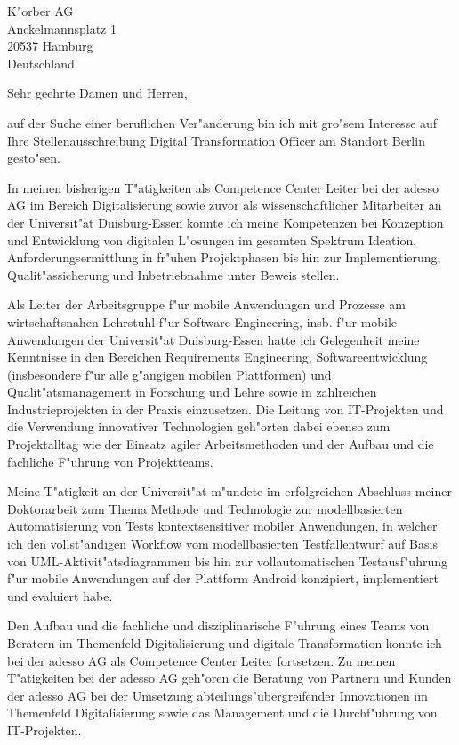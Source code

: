 \documentclass[10pt,a4paper]{dinbrief}
\date{\today}
\begin{document}
 
\begin{letter}  
{%
	K"orber AG\\
	Anckelmannsplatz 1\\
	20537 Hamburg\\
	Deutschland
}
\subject{\bf Bewerbung Digital Transformation Officer}
\opening{Sehr geehrte Damen und Herren,}
auf der Suche einer beruflichen Ver"anderung bin ich mit gro"sem Interesse auf Ihre Stellenausschreibung Digital Transformation Officer am Standort Berlin gesto"sen. 

In meinen bisherigen T"atigkeiten als Competence Center Leiter bei der adesso AG im Bereich Digitalisierung sowie zuvor als wissenschaftlicher Mitarbeiter an der Universit"at Duisburg-Essen konnte ich meine Kompetenzen bei Konzeption und Entwicklung von digitalen L"osungen im gesamten Spektrum Ideation, Anforderungsermittlung in fr"uhen Projektphasen bis hin zur Implementierung, Qualit"assicherung und Inbetriebnahme unter Beweis stellen.

Als Leiter der Arbeitsgruppe f"ur mobile Anwendungen und Prozesse am wirtschaftsnahen Lehrstuhl f"ur Software Engineering, insb. f"ur mobile Anwendungen der Universit"at Duisburg-Essen hatte ich Gelegenheit meine Kenntnisse in den Bereichen Requirements Engineering, Softwareentwicklung (insbesondere f"ur alle g"angigen mobilen Plattformen) und Qualit"atsmanagement in Forschung und Lehre sowie in zahlreichen Industrieprojekten in der Praxis einzusetzen. Die Leitung von IT-Projekten und die Verwendung innovativer Technologien geh"orten dabei ebenso zum Projektalltag wie der Einsatz agiler Arbeitsmethoden und der Aufbau und die fachliche  F"uhrung von Projektteams.

Meine T"atigkeit an der Universit"at m"undete im erfolgreichen Abschluss meiner Doktor\-arbeit zum Thema Methode und Technologie zur modellbasierten Automatisierung von Tests kontextsensitiver mobiler Anwendungen, in welcher ich den vollst"andigen Workflow vom modellbasierten Testfallentwurf auf Basis von UML-Aktivit"atsdiagrammen bis hin zur vollautomatischen Testausf"uhrung f"ur mobile Anwendungen auf der Plattform Android konzipiert, implementiert und evaluiert habe.

\clearpage
Den Aufbau und die fachliche und disziplinarische F"uhrung eines Teams von Beratern im Themenfeld Digitalisierung und digitale Transformation konnte ich bei der adesso AG als Competence Center Leiter fortsetzen. Zu meinen T"atigkeiten bei der adesso AG geh"oren die Beratung von Partnern und Kunden der adesso AG bei der Umsetzung abteilungs"ubergreifender Innovationen im Themenfeld Digitalisierung sowie das Management und die Durchf"uhrung von IT-Projekten.


\end{letter}
\end{document}
